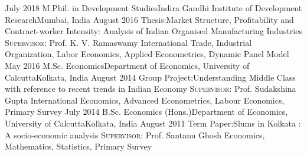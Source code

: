 %
%
%
\begin{experiences}
  \consultantexperience
  {July 2018}       {M.Phil. in Development Studies}{Indira Gandhi Institute of Development Research}{Mumbai, India}
  {August 2016}      {Thesis:}{Market Structure, Profitability and Contract-worker Intensity: Analysis of Indian Organised Manufacturing Industries}
                    {\textsc{Supervisor:} Prof. K. V. Ramaswamy
                    }
                    {International Trade, Industrial Organization, Labor Economics, Applied Econometrics, Dynamic Panel Model}
  \emptySeparator
  \consultantexperience
  {May 2016}      {M.Sc. Economics}{Department of Economics, University of Calcutta}{Kolkata, India}
  {August 2014}       {Group Project:}{Understanding Middle Class with reference to recent trends in Indian Economy}
                    {\textsc{Supervisor:} Prof. Sudakshina Gupta}
                    {International Economics, Advanced Econometrics, Labour Economics, Primary Survey} 
  \emptySeparator   
  \consultantexperience
  {July 2014}    {B.Sc. Economics (Hons.)}{Department of Economics, University of Calcutta}{Kolkata, India}
  {August 2011}    {Term Paper:}{Slums in Kolkata : A socio-economic analysis}
                    {\textsc{Supervisor:} Prof. Santanu Ghosh
                    }
                    {Economics, Mathematics, Statistics, Primary Survey}
\end{experiences}
